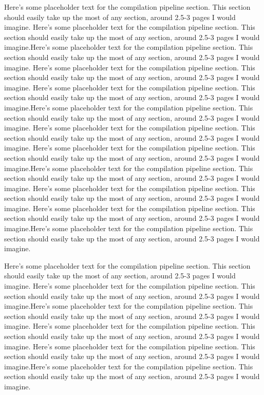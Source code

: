 \documentclass[preprint]{sigplanconf}
\begin{document}
Here's some placeholder text for the compilation pipeline section.  This
section should easily take up the most of any section, around 2.5-3 pages I
would imagine.
Here's some placeholder text for the compilation pipeline section.  This
section should easily take up the most of any section, around 2.5-3 pages I
would imagine.Here's some placeholder text for the compilation pipeline section.
 This
section should easily take up the most of any section, around 2.5-3 pages I
would imagine.
Here's some placeholder text for the compilation pipeline section.  This
section should easily take up the most of any section, around 2.5-3 pages I
would imagine.
Here's some placeholder text for the compilation pipeline section.  This
section should easily take up the most of any section, around 2.5-3 pages I
would imagine.Here's some placeholder text for the compilation pipeline section.
 This
section should easily take up the most of any section, around 2.5-3 pages I
would imagine.
Here's some placeholder text for the compilation pipeline section.  This
section should easily take up the most of any section, around 2.5-3 pages I
would imagine.
Here's some placeholder text for the compilation pipeline section.  This
section should easily take up the most of any section, around 2.5-3 pages I
would imagine.Here's some placeholder text for the compilation pipeline section.
 This
section should easily take up the most of any section, around 2.5-3 pages I
would imagine.
Here's some placeholder text for the compilation pipeline section.  This
section should easily take up the most of any section, around 2.5-3 pages I
would imagine.
Here's some placeholder text for the compilation pipeline section.  This
section should easily take up the most of any section, around 2.5-3 pages I
would imagine.Here's some placeholder text for the compilation pipeline section.
 This
section should easily take up the most of any section, around 2.5-3 pages I
would imagine.

Here's some placeholder text for the compilation pipeline section.  This
section should easily take up the most of any section, around 2.5-3 pages I
would imagine.
Here's some placeholder text for the compilation pipeline section.  This
section should easily take up the most of any section, around 2.5-3 pages I
would imagine.Here's some placeholder text for the compilation pipeline section.
 This
section should easily take up the most of any section, around 2.5-3 pages I
would imagine.
Here's some placeholder text for the compilation pipeline section.  This
section should easily take up the most of any section, around 2.5-3 pages I
would imagine.
Here's some placeholder text for the compilation pipeline section.  This
section should easily take up the most of any section, around 2.5-3 pages I
would imagine.Here's some placeholder text for the compilation pipeline section.
 This
section should easily take up the most of any section, around 2.5-3 pages I
would imagine.
\end{document}
